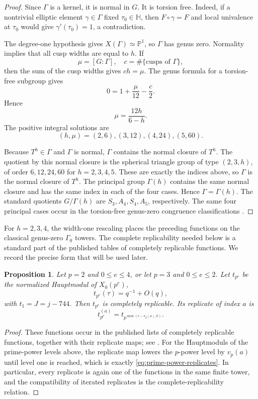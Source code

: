 \documentclass[11pt]{amsart}
\newtheorem{prop}[thm]{Proposition}
\theoremstyle{definition}
\theoremstyle{remark}
\numberwithin{equation}{section}
\begin{document}
\begin{proof}
Since $\Gamma$ is a kernel, it is normal in $G$.  It is torsion free.  Indeed, if a nontrivial elliptic element $\gamma\in\Gamma$ fixed $\tau_0\in\mathbb H$, then $F\circ\gamma=F$ and local univalence at $\tau_0$ would give $\gamma'(\tau_0)=1$, a contradiction.

The degree-one hypothesis gives $X(\Gamma)\simeq\mathbb P^1$, so $\Gamma$ has genus zero.  Normality implies that all cusp widths are equal to $h$.  If
\[
\mu=[G:\Gamma],
\quad c=\#\{\text{cusps of }\Gamma\},
\]
then the sum of the cusp widths gives $ch=\mu$.  The genus formula for a torsion-free subgroup gives
\[
0=1+\frac{\mu}{12}-\frac c2.
\]
Hence
\[
\mu=\frac{12h}{6-h}.
\]
The positive integral solutions are
\[
(h,\mu)=(2,6),(3,12),(4,24),(5,60).
\]

Because $T^h\in\Gamma$ and $\Gamma$ is normal, $\Gamma$ contains the normal closure of $T^h$.  The quotient by this normal closure is the spherical triangle group of type $(2,3,h)$, of order $6,12,24,60$ for $h=2,3,4,5$.  These are exactly the indices above, so $\Gamma$ is the normal closure of $T^h$.  The principal group $\Gamma(h)$ contains the same normal closure and has the same index in each of the four cases.  Hence $\Gamma=\Gamma(h)$.  The standard quotients $G/\Gamma(h)$ are $S_3,A_4,S_4,A_5$, respectively.  The same four principal cases occur in the torsion-free genus-zero congruence classifications \cite{sebbar-duke}.
\end{proof}

For $h=2,3,4$, the width-one rescaling places the preceding functions on the classical genus-zero $\Gamma_0$ towers.  The complete replicability needed below is a standard part of the published tables of completely replicable functions.  We record the precise form that will be used later.

\begin{prop}\label{prop:prime-power-Hauptmodul-replication}
Let $p=2$ and $0\leq e\leq4$, or let $p=3$ and $0\leq e\leq2$.  Let $t_{p^e}$ be the normalized Hauptmodul of $X_0(p^e)$,
\[
t_{p^e}(\tau)=q^{-1}+O(q),
\]
with $t_1=J=j-744$.  Then $t_{p^e}$ is completely replicable.  Its replicate of index $a$ is
\begin{equation}\label{eq:prime-power-replicates}
t_{p^e}^{(a)}
=
t_{p^{\max(e-v_p(a),0)}}.
\end{equation}
\end{prop}

\begin{proof}
These functions occur in the published lists of completely replicable functions, together with their replicate maps; see \cite{alexander-replicable,ford-mckay-norton}.  For the Hauptmoduls of the prime-power levels above, the replicate map lowers the $p$-power level by $v_p(a)$ until level one is reached, which is exactly \eqref{eq:prime-power-replicates}.  In particular, every replicate is again one of the functions in the same finite tower, and the compatibility of iterated replicates is the complete-replicability relation.
\end{proof}
\end{document}
